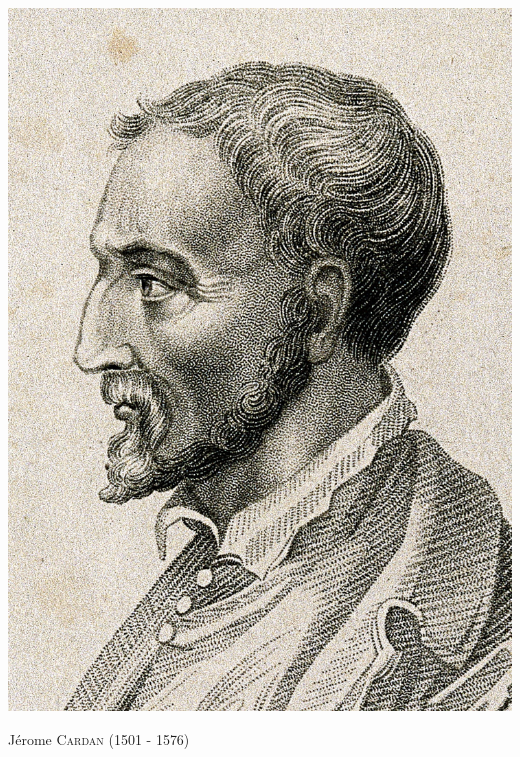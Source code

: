 
\begin{marginfigure}[5cm]
    \centering
    \includegraphics{images/jerome_cardan.jpg}
    \caption*{\centering Jérome \textsc{Cardan} (1501 - 1576)}
\end{marginfigure}

